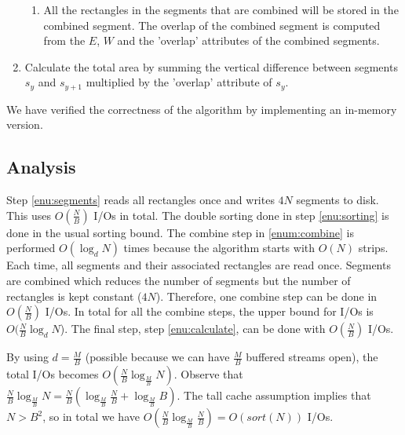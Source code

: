 \begin{enumerate}
\begin{enumerate}
        \item All the rectangles in the segments that are combined will be stored in the combined segment. The overlap of the combined segment is computed from the $E$, $W$ and the 'overlap' attributes of the combined segments.
    \end{enumerate}
\item \label{enu:calculate} Calculate the total area by summing the vertical difference between segments $s_{y}$ and $s_{y+1}$ multiplied by the 'overlap' attribute of $s_{y}$.
\end{enumerate}

We have verified the correctness of the algorithm by implementing an in-memory version.

\subsection{Analysis}

Step \ref{enu:segments} reads all rectangles once and writes $4N$ segments to disk. This uses $O(\frac{N}{B})$ I/Os in total. The double sorting done in step \ref{enu:sorting} is done in the usual sorting bound. The combine step in \ref{enum:combine} is performed $O(\log_{d}{N})$ times because the algorithm starts with $O(N)$ strips. Each time, all segments and their associated rectangles are read once. Segments are combined which reduces the number of segments but the number of rectangles is kept constant ($4N$). Therefore, one combine step can be done in $O(\frac{N}{B})$ I/Os. In total for all the combine steps, the upper bound for I/Os is $O(\frac{N}{B}\log_{d}{N}$). The final step, step \ref{enu:calculate}, can be done with $O(\frac{N}{B})$ I/Os.

By using $d = \frac{M}{B}$ (possible because we can have $\frac{M}{B}$ buffered streams open), the total I/Os becomes $O(\frac{N}{B}\log_{\frac{M}{B}}{N})$. Observe that $\frac{N}{B}\log_{\frac{M}{B}}{N}=\frac{N}{B}(\log_{\frac{M}{B}}{\frac{N}{B}}+\log_{\frac{M}{B}}{B})$. The tall cache assumption implies that $N>B^2$, so in total we have $O(\frac{N}{B}\log_{\frac{M}{B}}{\frac{N}{B}})=O(sort(N))$ I/Os.

